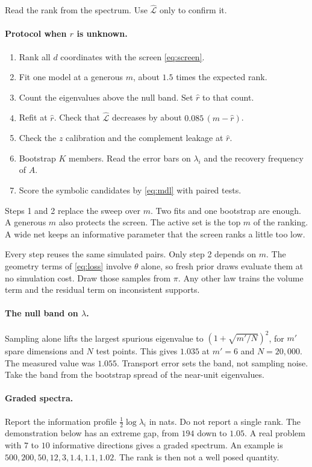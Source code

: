 \documentclass[11pt, letterpaper]{article}
\theoremstyle{definition}
\begin{document}
Read the rank from the spectrum. Use $\hat{\mathcal{L}}$ only to confirm it.

\paragraph{Protocol when $r$ is unknown.}
\begin{enumerate}\itemsep0pt
  \item Rank all $d$ coordinates with the screen \eqref{eq:screen}.
  \item Fit one model at a generous $m$, about $1.5$ times the expected rank.
  \item Count the eigenvalues above the null band. Set $\hat r$ to that count.
  \item Refit at $\hat r$. Check that $\hat{\mathcal{L}}$ decreases by about
        $0.085\,(m-\hat r)$.
  \item Check the $z$ calibration and the complement leakage at $\hat r$.
  \item Bootstrap $K$ members. Read the error bars on $\lambda_i$ and the
        recovery frequency of $A$.
  \item Score the symbolic candidates by \eqref{eq:mdl} with paired tests.
\end{enumerate}
Steps 1 and 2 replace the sweep over $m$. Two fits and one bootstrap are enough.
A generous $m$ also protects the screen. The active set is the top $m$ of the
ranking. A wide net keeps an informative parameter that the screen ranks a
little too low.

Every step reuses the same simulated pairs. Only step 2 depends on $m$. The
geometry terms of \eqref{eq:loss} involve $\theta$ alone, so fresh prior draws
evaluate them at no simulation cost. Draw those samples from $\pi$. Any other
law trains the volume term and the residual term on inconsistent supports.

\paragraph{The null band on $\lambda$.}
Sampling alone lifts the largest spurious eigenvalue to $(1+\sqrt{m'/N})^2$, for
$m'$ spare dimensions and $N$ test points. This gives $1.035$ at $m'=6$ and
$N=20{,}000$. The measured value was $1.055$. Transport error sets the band, not
sampling noise. Take the band from the bootstrap spread of the near-unit
eigenvalues.

\paragraph{Graded spectra.}
Report the information profile $\tfrac12\log\lambda_i$ in nats. Do not report a
single rank. The demonstration below has an extreme gap, from $194$ down to
$1.05$. A real problem with $7$ to $10$ informative directions gives a graded
spectrum. An example is $500,200,50,12,3,1.4,1.1,1.02$. The rank is then not a
well posed quantity.
\end{document}
